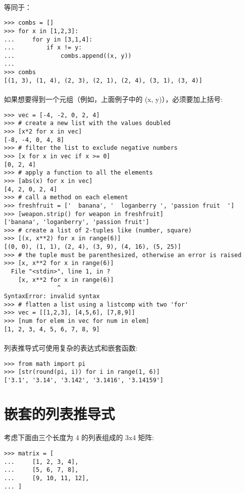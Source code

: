 \documentclass{article}
\begin{document}
\begin{CJK}{UTF8}{gbsn}
\paragraph{}
等同于：
\begin{verbatim}
>>> combs = []
>>> for x in [1,2,3]:
...     for y in [3,1,4]:
...         if x != y:
...             combs.append((x, y))
...
>>> combs
[(1, 3), (1, 4), (2, 3), (2, 1), (2, 4), (3, 1), (3, 4)]
\end{verbatim}
\paragraph{}
如果想要得到一个元组（例如，上面例子中的 (x, y)），必须要加上括号:
\begin{verbatim}
>>> vec = [-4, -2, 0, 2, 4]
>>> # create a new list with the values doubled
>>> [x*2 for x in vec]
[-8, -4, 0, 4, 8]
>>> # filter the list to exclude negative numbers
>>> [x for x in vec if x >= 0]
[0, 2, 4]
>>> # apply a function to all the elements
>>> [abs(x) for x in vec]
[4, 2, 0, 2, 4]
>>> # call a method on each element
>>> freshfruit = ['  banana', '  loganberry ', 'passion fruit  ']
>>> [weapon.strip() for weapon in freshfruit]
['banana', 'loganberry', 'passion fruit']
>>> # create a list of 2-tuples like (number, square)
>>> [(x, x**2) for x in range(6)]
[(0, 0), (1, 1), (2, 4), (3, 9), (4, 16), (5, 25)]
>>> # the tuple must be parenthesized, otherwise an error is raised
>>> [x, x**2 for x in range(6)]
  File "<stdin>", line 1, in ?
    [x, x**2 for x in range(6)]
               ^
SyntaxError: invalid syntax
>>> # flatten a list using a listcomp with two 'for'
>>> vec = [[1,2,3], [4,5,6], [7,8,9]]
>>> [num for elem in vec for num in elem]
[1, 2, 3, 4, 5, 6, 7, 8, 9]
\end{verbatim}
\paragraph{}
列表推导式可使用复杂的表达式和嵌套函数:
\begin{verbatim}
>>> from math import pi
>>> [str(round(pi, i)) for i in range(1, 6)]
['3.1', '3.14', '3.142', '3.1416', '3.14159']
\end{verbatim}
\section{嵌套的列表推导式}
\paragraph{}
考虑下面由三个长度为 4 的列表组成的 3x4 矩阵:
\begin{verbatim}
>>> matrix = [
...     [1, 2, 3, 4],
...     [5, 6, 7, 8],
...     [9, 10, 11, 12],
... ]
\end{verbatim}

\end{CJK}
\end{document}
